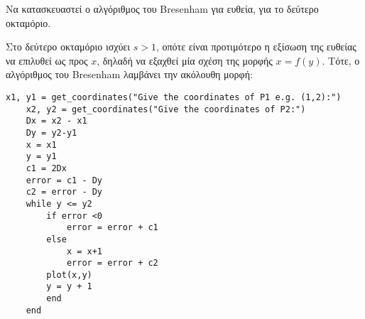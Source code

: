\begin{exercise}

Να κατασκευαστεί ο αλγόριθμος του Bresenham για ευθεία, για το δεύτερο οκταμόριο.
\end{exercise}

\begin{solution}
	Στο δεύτερο οκταμόριο ισχύει $s >1$, οπότε είναι προτιμότερο η εξίσωση της ευθείας να επιλυθεί ως προς $x$, δηλαδή να εξαχθεί μία σχέση της μορφής $x= f (y)$. Τότε, ο αλγόριθμος του Bresenham λαμβάνει την ακόλουθη μορφή:
	
\begin{lstlisting}[caption={Bresenham Algorithm for 2nd Octant Line Algorithm}]
	x1, y1 = get_coordinates("Give the coordinates of P1 e.g. (1,2):")
	x2, y2 = get_coordinates("Give the coordinates of P2:")
	Dx = x2 - x1
	Dy = y2-y1
	x = x1
	y = y1
	c1 = 2Dx
	error = c1 - Dy
	c2 = error - Dy
	while y <= y2
		if error <0
			error = error + c1
		else
			x = x+1
			error = error + c2
		plot(x,y)
		y = y + 1
		end
	end	
\end{lstlisting}


\end{solution}